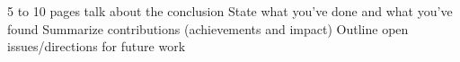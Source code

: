 5 to 10 pages
talk about the conclusion
State what you've done and what you've found
Summarize contributions (achievements and impact)
Outline open issues/directions for future work